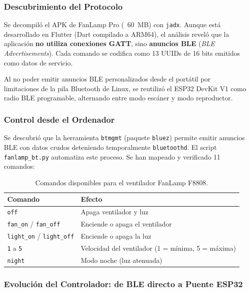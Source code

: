 \subsubsection{Descubrimiento del Protocolo}
Se decompiló el APK de FanLamp Pro (~60~MB) con \texttt{jadx}. Aunque está desarrollado en Flutter (Dart compilado a ARM64), el análisis reveló que la aplicación \textbf{no utiliza conexiones GATT}, sino \textbf{anuncios BLE} (\textit{BLE Advertisements}). Cada comando se codifica como 13 UUIDs de 16 bits emitidos como datos de servicio.

Al no poder emitir anuncios BLE personalizados desde el portátil por limitaciones de la pila Bluetooth de Linux, se reutilizó el ESP32 DevKit V1 como radio BLE programable, alternando entre modo escáner y modo reproductor.

\subsubsection{Control desde el Ordenador}
Se descubrió que la herramienta \texttt{btmgmt} (paquete \texttt{bluez}) permite emitir anuncios BLE con datos crudos deteniendo temporalmente \texttt{bluetoothd}. El script \texttt{fanlamp\_bt.py} automatiza este proceso. Se han mapeado y verificado 11 comandos:

\begin{table}[ht]
\centering
\begin{tabular}{|l|p{6cm}|}
\hline
\textbf{Comando} & \textbf{Efecto} \\
\hline
\texttt{off} & Apaga ventilador y luz \\
\texttt{fan\_on} / \texttt{fan\_off} & Enciende o apaga el ventilador \\
\texttt{light\_on} / \texttt{light\_off} & Enciende o apaga la luz \\
\texttt{1} a \texttt{5} & Velocidad del ventilador (1 = mínima, 5 = máxima) \\
\texttt{night} & Modo noche (luz atenuada) \\
\hline
\end{tabular}
\caption{Comandos disponibles para el ventilador FanLamp F8808.}
\end{table}

\subsubsection{Evolución del Controlador: de BLE directo a Puente ESP32}
\label{sec:fanlamp_evolucion}

